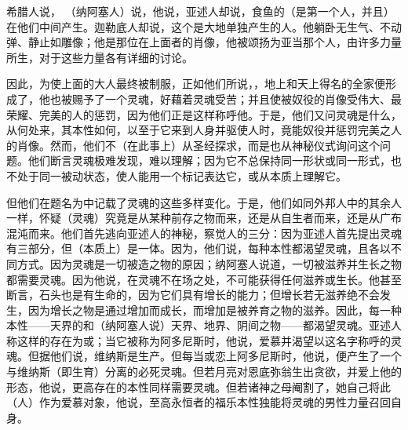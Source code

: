 希腊人说， （纳阿塞人）说，他说，亚述人却说，食鱼的（是第一个人，并且）在他们中间产生。迦勒底人却说，这个是大地单独产生的人。他躺卧无生气、不动弹、静止如雕像；他是那位在上面者的肖像，他被颂扬为亚当那个人，由许多力量所生，对于这些力量各有详细的讨论。\par

因此，为使上面的大人最终被制服，正如他们所说，，地上和天上得名的全家便形成了，他也被赐予了一个灵魂，好藉着灵魂受苦；并且使被奴役的肖像受伟大、最荣耀、完美的人的惩罚，因为他们正是这样称呼他。于是，他们又问灵魂是什么，从何处来，其本性如何，以至于它来到人身并驱使人时，竟能奴役并惩罚完美之人的肖像。然而，他们不（在此事上）从圣经探求，而是也从神秘仪式询问这个问题。他们断言灵魂极难发现，难以理解；因为它不总保持同一形状或同一形式，也不处于同一被动状态，使人能用一个标记表达它，或从本质上理解它。\par

但他们在题名为中记载了灵魂的这些多样变化。于是，他们如同外邦人中的其余人一样，怀疑（灵魂）究竟是从某种前存之物而来，还是从自生者而来，还是从广布混沌而来。他们首先逃向亚述人的神秘，察觉人的三分：因为亚述人首先提出灵魂有三部分，但（本质上）是一体。因为，他们说，每种本性都渴望灵魂，且各以不同方式。因为灵魂是一切被造之物的原因；纳阿塞人说道，一切被滋养并生长之物都需要灵魂。因为他说，在灵魂不在场之处，不可能获得任何滋养或生长。他甚至断言，石头也是有生命的，因为它们具有增长的能力；但增长若无滋养绝不会发生，因为增长之物是通过增加而成长，而增加是被养育之物的滋养。因此，每一种本性——天界的和（纳阿塞人说）天界、地界、阴间之物——都渴望灵魂。亚述人称这样的存在为或；当它被称为阿多尼斯时，他说，爱慕并渴望以这名字称呼的灵魂。但据他们说，维纳斯是生产。但每当或恋上阿多尼斯时，他说，便产生了一个与维纳斯（即生育）分离的必死灵魂。但若月亮对恩底弥翁生出贪欲，并爱上他的形态，他说，更高存在的本性同样需要灵魂。但若诸神之母阉割了，她自己将此（人）作为爱慕对象，他说，至高永恒者的福乐本性独能将灵魂的男性力量召回自身。\par

